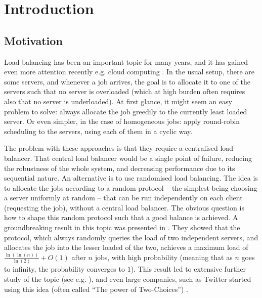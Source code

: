 \chapter{Introduction}\label{introduction}

\ifpdf
    \graphicspath{{Chapter1/Figs/Raster/}{Chapter1/Figs/PDF/}{Chapter1/Figs/}}
\else
    \graphicspath{{Chapter1/Figs/Vector/}{Chapter1/Figs/}}
\fi


\section{Motivation}

Load balancing has been an important topic for many years, and it has gained even more attention recently e.g. cloud computing \cite{mishra2020cloud}. In the usual setup, there are some servers, and whenever a job arrives, the goal is to allocate it to one of the servers such that no server is overloaded (which at high burden often requires also that no server is underloaded). At first glance, it might seem an easy problem to solve: always allocate the job greedily to the currently least loaded server. Or even simpler, in the case of homogeneous jobs: apply round-robin scheduling to the servers, using each of them in a cyclic way. 

The problem with these approaches is that they require a centralised load balancer. That central load balancer would be a single point of failure, reducing the robustness of the whole system, and decreasing performance due to its sequential nature. An alternative is to use randomised load balancing. The idea is to allocate the jobs according to a random protocol -- the simplest being choosing a server uniformly at random -- that can be run independently on each client (requesting the job), without a central load balancer. The obvious question is how to shape this random protocol such that a good balance is achieved. A groundbreaking result in this topic was presented in \cite{azar1999twochoice}. They showed that the \TwoChoice protocol, which always randomly queries the load of two independent servers, and allocates the job into the lesser loaded of the two, achieves a maximum load of $\frac{\ln(\ln(n))}{\ln(2)} + O(1)$ after $n$ jobs, with high probability (meaning that as $n$ goes to infinity, the probability converges to $1$). This result led to extensive further study of the topic (see e.g. \cite{richa2001surveytwochoice}), and even large companies, such as Twitter started using this idea (often called ``The power of Two-Choices'') \cite{anderson2019twitter}.


